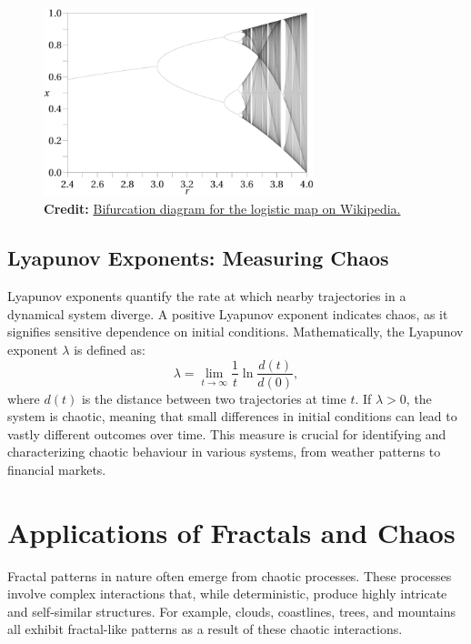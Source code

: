 \documentclass[12pt]{article}
\begin{document}
\begin{figure}[H]
\centering
\includegraphics[width=0.7\textwidth]{assets/bifurcation.png}
\caption{\textbf{Credit:} \href{https://en.wikipedia.org/wiki/Logistic_map\#/media/File:Logistic_Bifurcation_map_High_Resolution.png}{Bifurcation diagram for the logistic map on Wikipedia.}}
\label{fig:bifurcation}
\end{figure}

\newpage

\subsection{Lyapunov Exponents: Measuring Chaos}
Lyapunov exponents quantify the rate at which nearby trajectories in a dynamical system diverge. A positive Lyapunov exponent indicates chaos, as it signifies sensitive dependence on initial conditions. Mathematically, the Lyapunov exponent \( \lambda \) is defined as:
\[
\lambda = \lim_{t \to \infty} \frac{1}{t} \ln \frac{d(t)}{d(0)} ,
\]
where \( d(t) \) is the distance between two trajectories at time \( t \). If \( \lambda > 0 \), the system is chaotic, meaning that small differences in initial conditions can lead to vastly different outcomes over time. This measure is crucial for identifying and characterizing chaotic behaviour in various systems, from weather patterns to financial markets.

\section{Applications of Fractals and Chaos}
Fractal patterns in nature often emerge from chaotic processes. These processes involve complex interactions that, while deterministic, produce highly intricate and self-similar structures. For example, clouds, coastlines, trees, and mountains all exhibit fractal-like patterns as a result of these chaotic interactions. 
\end{document}

